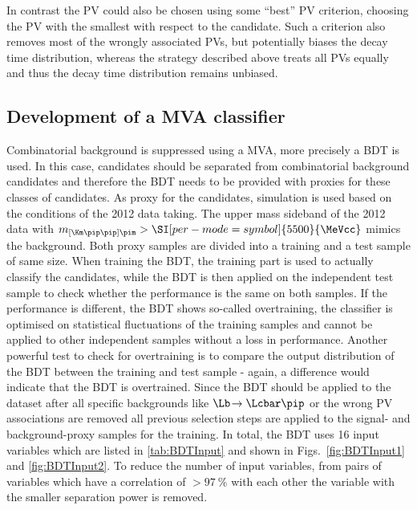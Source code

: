 In contrast the \ac{PV} could also be chosen using some \enquote{best} \ac{PV} criterion, \eg choosing the \ac{PV} with the smallest \chisqip with respect to the \Bz candidate.
Such a criterion also removes most of the wrongly associated \ac{PV}s, but potentially biases the decay time distribution, whereas the strategy described above treats all \ac{PV}s equally and thus the decay time distribution remains unbiased.

\subsection{Development of a MVA classifier}
\label{sec:MVADev}

Combinatorial background is suppressed using a \ac{MVA}, more precisely a \ac{BDT} is used.
In this case, \BdToDpi candidates should be separated from combinatorial background candidates and therefore the BDT needs to be provided with proxies for these classes of candidates.
As proxy for the \BdToDpi candidates, simulation is used based on the conditions of the \num{2012} data taking.
The upper mass sideband of the \num{2012} data with $m_{\left[\Km\pip\pip\right]\pim}>\SI[per-mode=symbol]{5500}{\MeVcc}$ mimics the background.
Both proxy samples are divided into a training and a test sample of same size.
When training the \ac{BDT}, the training part is used to actually classify the candidates, while the \ac{BDT} is then applied on the independent test sample to check whether the performance is the same on both samples.
If the performance is different, the \ac{BDT} shows so-called overtraining, \ie the classifier is optimised on statistical fluctuations of the training samples and cannot be applied to other independent samples without a loss in performance.
Another powerful test to check for overtraining is to compare the output distribution of the \ac{BDT} between the training and test sample - again, a difference would indicate that the \ac{BDT} is overtrained.
Since the \ac{BDT} should be applied to the dataset after all specific backgrounds like $\Lb\!\to\Lcbar\pip$ or the wrong PV associations are removed  all previous selection steps are applied to the signal- and background-proxy samples for the training.
In total, the \ac{BDT} uses \num{16} input variables which are listed in \cref{tab:BDTInput} and shown in Figs.~\ref{fig:BDTInput1} and \ref{fig:BDTInput2}.
To reduce the number of input variables, from pairs of variables which have a correlation of $>\SI{97}{\percent}$ with each other the variable with the smaller separation power is removed.
